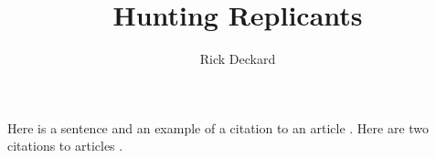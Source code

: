 \documentclass{article}
\title{Hunting Replicants}
\author{Rick Deckard}
\begin{document}
\maketitle

Here is a sentence and an example of a citation 
to an article \cite{mattar:2005aa}. Here are two 
citations to articles \cite{mattar:2005aa, mcgregor:2016aa}.

 

\end{document}
